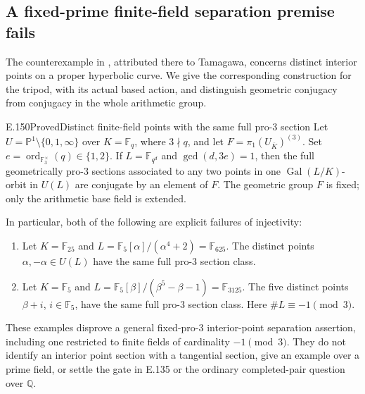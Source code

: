 \subsection{A fixed-prime finite-field separation premise fails}

The counterexample in \citet[Remark~10(i), pp.~742--743]{LitHoshi2009Configurations},
attributed there to Tamagawa, concerns distinct interior points on a proper
hyperbolic curve.  We give the corresponding construction for the tripod,
with its actual based action, and distinguish geometric conjugacy from
conjugacy in the whole arithmetic group.

\begin{result}{E.150}{Proved}{Distinct finite-field points with the same full pro-\(3\) section}
Let \(U=\mathbb P^1\setminus\{0,1,\infty\}\) over
\(K=\mathbb F_q\), where \(3\nmid q\), and let
\(F=\pi_1(U_{\overline K})^{(3)}\).  Set
\(e=\operatorname{ord}_{\mathbb F_3^\times}(q)\in\{1,2\}\).
If \(L=\mathbb F_{q^d}\) and \(\gcd(d,3e)=1\), then the
full geometrically pro-\(3\) sections associated to any two points in
one \(\operatorname{Gal}(L/K)\)-orbit in \(U(L)\) are conjugate
by an element of \(F\).  The geometric group \(F\) is fixed;
only the arithmetic base field is extended.

In particular, both of the following are explicit failures of injectivity:
\begin{enumerate}
\item Let \(K=\mathbb F_{25}\) and
\(L=\mathbb F_5[\alpha]/(\alpha^4+2)=\mathbb F_{625}\).
The distinct points \(\alpha,-\alpha\in U(L)\) have the same
full pro-\(3\) section class.
\item Let \(K=\mathbb F_5\) and
\(L=\mathbb F_5[\beta]/(\beta^5-\beta-1)=\mathbb F_{3125}\).
The five distinct points \(\beta+i\), \(i\in\mathbb F_5\),
have the same full pro-\(3\) section class.  Here
\(\#L\equiv-1\pmod3\).
\end{enumerate}
These examples disprove a general fixed-pro-\(3\) interior-point
separation assertion, including one restricted to finite fields of
cardinality \(-1\pmod3\).  They do not identify an interior point
section with a tangential section, give an example over a prime field,
or settle the gate in E.135 or the ordinary completed-pair question over
\(\mathbb Q\).
\end{result}
